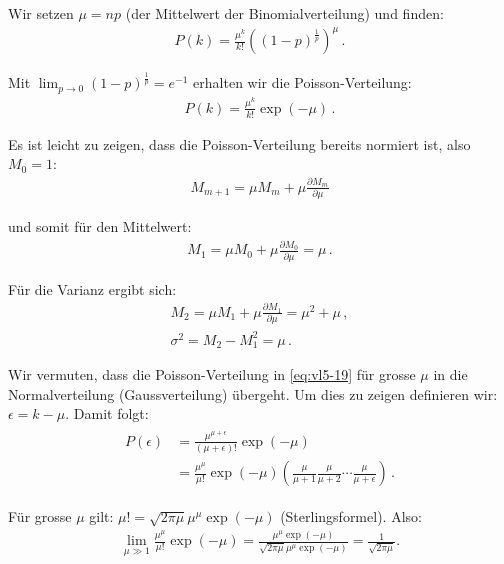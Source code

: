 Wir setzen $\mu = np$ (der Mittelwert der Binomialverteilung) und finden:
\begin{align}
P(k) = \frac{ \mu^k }{ k! } \left( (1 - p)^{\frac{1}{p}} \right)^\mu \,.
\label{eq:vl5-18}
\end{align}

Mit $\lim_{p \rightarrow 0} (1 - p)^{\frac{1}{p}} = e^{-1}$ erhalten wir die Poisson-Verteilung:
\begin{align}
P(k) = \frac{ \mu^k }{ k! } \exp(-\mu) \,.
\label{eq:vl5-19}
\end{align}

Es ist leicht zu zeigen, dass die Poisson-Verteilung bereits normiert ist, also $M_0 = 1$:
\begin{align}
 M_{m + 1} = \mu M_m + \mu \frac{ \partial M_m }{ \partial \mu }
\label{eq:vl5-20}
\end{align}

und somit f\"ur den Mittelwert:
\begin{align}
 M_1 = \mu M_0 + \mu \frac{ \partial M_0 }{ \partial \mu } = \mu\,.
\label{eq:vl5-21}
\end{align}

F\"ur die Varianz ergibt sich:
\begin{align}
M_2 = \mu M_1 + \mu \frac{ \partial M_1 }{ \partial \mu } = \mu^2 + \mu\,,\\
\sigma^2 =  M_2 - M_1^2 = \mu\,.
\label{eq:vl5-22}
\end{align}

Wir vermuten, dass die Poisson-Verteilung in \cref{eq:vl5-19} für grosse $\mu$ in die Normalverteilung (Gaussverteilung) übergeht. Um dies zu zeigen definieren wir: $\epsilon = k - \mu$. Damit folgt:
\begin{align}
\begin{split}
 P (\epsilon) &= \frac{ \mu^{\mu + \epsilon} }{ (\mu + \epsilon)! } \exp (-\mu)\\
 &= \frac{ \mu^\mu }{ \mu! } \exp (-\mu) \left( \frac{ \mu }{ \mu + 1 } \frac{ \mu }{ \mu + 2 } \cdots \frac{ \mu }{ \mu + \epsilon } \right) \,.
\label{eq:vl5-24}
\end{split}
\end{align}

F\"ur grosse $\mu$ gilt: $\mu! = \sqrt{2 \pi \mu} \mu^\mu \exp(-\mu)$ (Sterlingsformel). Also:
\begin{align}
\lim_{\mu \gg 1} \frac{ \mu^\mu }{ \mu! } \exp (-\mu) = \frac{ \mu^\mu \exp ( -\mu ) }{ \sqrt{2 \pi \mu} \mu^\mu \exp(-\mu) } = \frac{ 1 }{ \sqrt{ 2 \pi \mu} }.
\label{eq:vl5-25}
\end{align}

